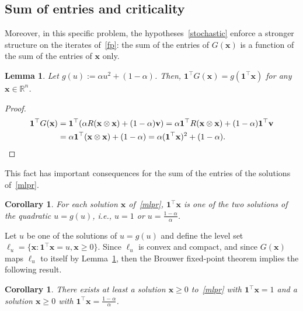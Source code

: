 \documentclass[10pt]{paper}
\newtheorem{lemma}[theorem]{Lemma}
\newtheorem{corollary}[theorem]{Corollary}
\begin{document}
\subsection{Sum of entries and criticality}
Moreover, in this specific problem, the hypotheses~\eqref{stochastic} enforce a stronger structure on the iterates of~\eqref{fp}: the sum of the entries of $G({\mathbf{x}})$ is a function of the sum of the entries of ${\mathbf{x}}$ only.

\begin{lemma}
Let $g(u):=\alpha u^2 + (1-\alpha)$. Then,  ${\mathbf{1}}^\top G({\mathbf{x}}) = g({\mathbf{1}}^\top {\mathbf{x}})$ for any ${\mathbf{x}}\in\mathbb R^n$.\label{lem:gu}
\end{lemma}
\begin{proof}
\begin{align*}
{\mathbf{1}}^\top G({\mathbf{x}}) &= {\mathbf{1}}^\top (\alpha R({\mathbf{x}} \otimes {\mathbf{x}}) + (1-\alpha) {\mathbf{v}}) = \alpha {\mathbf{1}}^\top R({\mathbf{x}} \otimes {\mathbf{x}}) + (1-\alpha) {\mathbf{1}}^\top {\mathbf{v}} 
\\&= \alpha {\mathbf{1}}^\top({\mathbf{x}} \otimes {\mathbf{x}}) + (1-\alpha) = \alpha ({\mathbf{1}}^\top {\mathbf{x}})^2 + (1-\alpha). \qedhere
\end{align*}
\end{proof}
This fact has important consequences for the sum of the entries of the solutions of~\eqref{mlpr}.
\begin{corollary}
For \label{solvalues} each solution ${\mathbf{x}}$ of~\eqref{mlpr}, ${\mathbf{1}}^\top {\mathbf{x}}$ is one of the two solutions of the quadratic $u = g(u)$, i.e., $u=1$ or $u=\frac{1-\alpha}{\alpha}$.
\end{corollary}

Let $u$ be one of the solutions of $u = g(u)$ and define the level set 
$\ell_u = \{{\mathbf{x}}: {\mathbf{1}}^\top{\mathbf{x}}=u, {\mathbf{x}}\geq 0\}$. Since $\ell_u$ is convex and compact, and since $G({\mathbf{x}})$ maps $\ell_u$ to itself by Lemma~\ref{lem:gu}, then  the Brouwer fixed-point theorem implies the following result.

\begin{corollary}
There exists at least a  solution ${\mathbf{x}}\ge 0$ to~\eqref{mlpr} with ${\mathbf{1}}^\top{\mathbf{x}} = 1$ and a solution ${\mathbf{x}}\ge0$ with ${\mathbf{1}}^\top{\mathbf{x}} = \frac{1-\alpha}{\alpha}$. 
\end{corollary}
\end{document}
